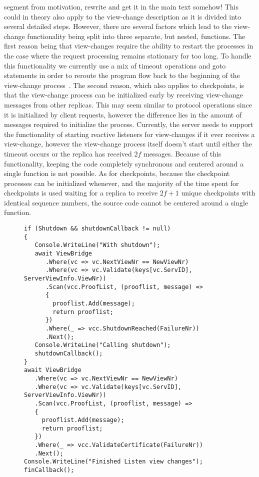 segment from motivation, rewrite and get it in the main text somehow!
This could in theory also apply to the view-change description as it is divided into several detailed steps. However, there are several factors which lead to the view-change functionality being split into three separate, but nested, functions. The first reason being that view-changes require the ability to restart the processes in the case where the request processing remains stationary for too long. To handle this functionality we currently use a mix of timeout operations and goto statements in order to reroute the program flow back to the beginning of the view-change process~\cite{WEB:goto}. The second reason, which also applies to checkpoints, is that the view-change process can be initialized early by receiving view-change messages from other replicas. This may seem similar to protocol operations since it is initialized by client requests, however the difference lies in the amount of messages required to initialize the process. Currently, the server needs to support the functionality of starting reactive listeners for view-changes if it ever receives a view-change, however the view-change process itself doesn't start until either the timeout occurs or the replica has received $2f$ messages. Because of this functionality, keeping the code completely synchronous and centered around a single function is not possible. As for checkpoints, because the checkpoint processes can be initialized whenever, and the majority of the time spent for checkpoints is used waiting for a replica to receive $2f+1$ unique checkpoints with identical sequence numbers, the source code cannot be centered around a single function.
\fi

\begin{figure}[H]
	\centering
	\begin{lstlisting}[label = code:viewListener, caption=Source code for View-Change Listener, captionpos = b, basicstyle=\scriptsize]
if (Shutdown && shutdownCallback != null)
{
   Console.WriteLine("With shutdown");
   await ViewBridge
      .Where(vc => vc.NextViewNr == NewViewNr)
      .Where(vc => vc.Validate(keys[vc.ServID], ServerViewInfo.ViewNr))
      .Scan(vcc.ProofList, (prooflist, message) =>
      {
        prooflist.Add(message);
        return prooflist;
      })
      .Where(_ => vcc.ShutdownReached(FailureNr))
      .Next();
   Console.WriteLine("Calling shutdown");
   shutdownCallback();
}
await ViewBridge
   .Where(vc => vc.NextViewNr == NewViewNr)
   .Where(vc => vc.Validate(keys[vc.ServID], ServerViewInfo.ViewNr))
   .Scan(vcc.ProofList, (prooflist, message) =>
   {
     prooflist.Add(message);
     return prooflist;
   })
   .Where(_ => vcc.ValidateCertificate(FailureNr))
   .Next();
Console.WriteLine("Finished Listen view changes");
finCallback();
    \end{lstlisting}
\end{figure}

